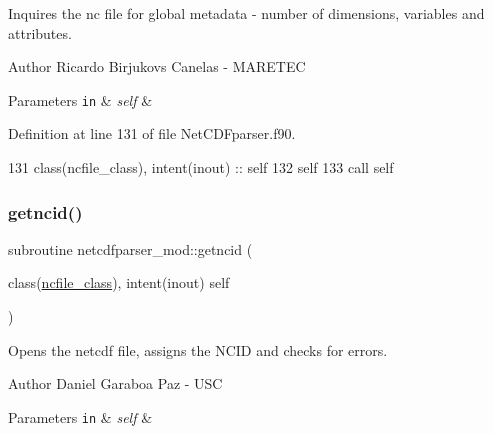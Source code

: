 Inquires the nc file for global metadata -\/ number of dimensions, variables and attributes. 

\begin{DoxyAuthor}{Author}
Ricardo Birjukovs Canelas -\/ M\+A\+R\+E\+T\+EC 
\end{DoxyAuthor}

\begin{DoxyParams}[1]{Parameters}
\mbox{\tt in}  & {\em self} & \\
\hline
\end{DoxyParams}


Definition at line 131 of file Net\+C\+D\+Fparser.\+f90.


\begin{DoxyCode}
131     \textcolor{keywordtype}{class}(ncfile\_class), \textcolor{keywordtype}{intent(inout)} :: self
132     self%
133     \textcolor{keyword}{call }self%
\end{DoxyCode}
\mbox{\label{namespacenetcdfparser__mod_a741dd5b5985255e73aa9d3cf08755e91}} 
\subsubsection{\texorpdfstring{getncid()}{getncid()}}
{\footnotesize\ttfamily subroutine netcdfparser\+\_\+mod\+::getncid (\begin{DoxyParamCaption}\item[{class(\mbox{\hyperlink{structnetcdfparser__mod_1_1ncfile__class}{ncfile\+\_\+class}}), intent(inout)}]{self }\end{DoxyParamCaption})\hspace{0.3cm}{\ttfamily [private]}}



Opens the netcdf file, assigns the N\+C\+ID and checks for errors. 

\begin{DoxyAuthor}{Author}
Daniel Garaboa Paz -\/ U\+SC 
\end{DoxyAuthor}

\begin{DoxyParams}[1]{Parameters}
\mbox{\tt in}  & {\em self} & \\
\hline
\end{DoxyParams}


